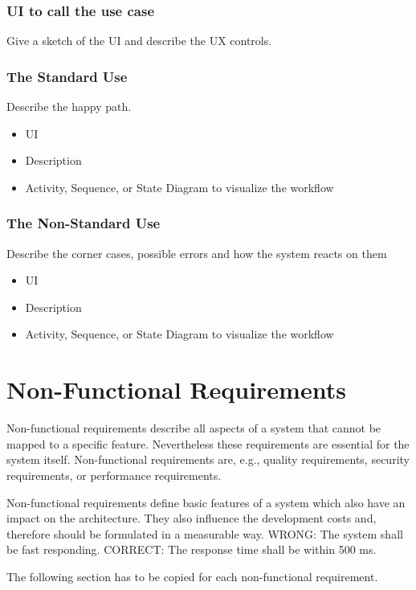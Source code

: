 \documentclass[12pt]{article}
\theoremstyle{definition}
\newenvironment{explanation}{%
   \setlength{\parindent}{0pt}
   \itshape
   \color{blue}
}{}
\begin{document}
\subsubsection{UI to call the use case}
\begin{explanation}
Give a sketch of the UI and describe the UX controls.
\end{explanation}

\subsubsection{The Standard Use}
\begin{explanation}
Describe the happy path.
\begin{itemize}
	\item UI
	\item Description
	\item Activity, Sequence, or State Diagram to visualize the workflow
\end{itemize}
\end{explanation}

\subsubsection{The Non-Standard Use}
\begin{explanation}
Describe the corner cases, possible errors and how the system reacts on them
\begin{itemize}
	\item UI
	\item Description
	\item Activity, Sequence, or State Diagram to visualize the workflow
\end{itemize}
\end{explanation}
\pagebreak

\section{Non-Functional Requirements}
\begin{explanation}
Non-functional requirements describe all aspects of a system that cannot be mapped to a specific feature. Nevertheless these requirements are essential for the system itself. Non-functional requirements are, e.g., quality requirements, security requirements, or performance requirements.

Non-functional requirements define basic features of a system which also have an impact on the architecture. They also influence the development costs and, therefore should be formulated in a measurable way.
WRONG: The system shall be fast responding.
CORRECT: The response time shall be within 500 ms.

The following section has to be copied for each non-functional requirement.
\end{explanation}
\end{document}
